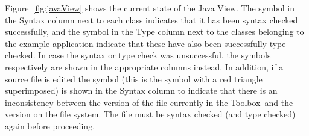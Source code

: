 \documentclass[\pformat,12pt]{article}
\newcommand{\Toolbox}{Toolbox}
\newcommand{\guicmd}[1]{{\sf #1}}
\begin{document}
Figure~\ref{fig:javaView} shows the current state of the \guicmd{Java
  View}. The symbol
in the \guicmd{Syntax} column next to each class indicates that it has
  been syntax checked successfully, and the symbol
  in the \guicmd{Type} column next to the classes belonging to the
  example application indicate that these have also been successfully
  type checked. In case the syntax or type check was unsuccessful, the
  symbols 
  respectively
are shown in the appropriate columns instead. In addition, if a source
  file is edited the symbol
  (this is the symbol 
with a red triangle superimposed)
is shown in the \guicmd{Syntax} column to indicate that there is an
  inconsistency between the version of the file 
currently in the \Toolbox\ and the version on the file system. The
file must be syntax checked (and type checked) again before proceeding.
\end{document}
